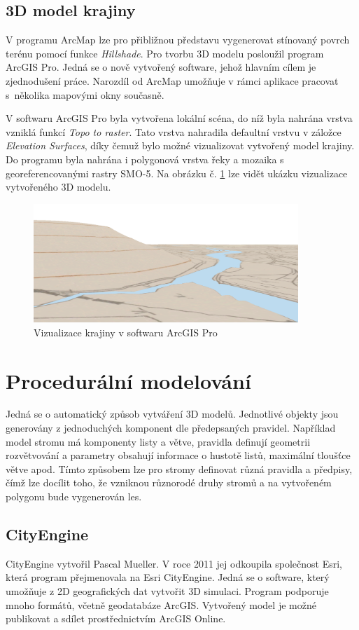 \documentclass[thesis=M,czech]{FITthesis}[2012/06/26]
\begin{document}
\subsection{3D model krajiny}
V programu ArcMap lze pro přibližnou představu vygenerovat stínovaný povrch terénu pomocí funkce \textit{Hillshade}. Pro tvorbu 3D modelu posloužil program ArcGIS Pro. Jedná se o nově vytvořený software, jehož hlavním cílem je zjednodušení práce. Narozdíl od ArcMap umožňuje v rámci aplikace pracovat s~několika mapovými okny současně. 

V softwaru ArcGIS Pro byla vytvořena lokální scéna, do níž byla nahrána vrstva vzniklá funkcí \textit{Topo to raster}. Tato vrstva nahradila defaultní vrstvu v záložce \textit{Elevation Surfaces}, díky čemuž bylo možné vizualizovat vytvořený model krajiny. Do programu byla nahrána i polygonová vrstva řeky a mozaika s georeferencovanými rastry SMO-5. Na obrázku č. \ref{obrazek:otava_knezihora} lze vidět ukázku vizualizace vytvořeného 3D modelu.

\begin{figure}[h]
	\centering
	\includegraphics[width=10cm]{pics/arcgispro.png}
	\caption{Vizualizace krajiny v softwaru ArcGIS Pro}
	\label{obrazek:otava_knezihora}
\end{figure}

\section{Procedurální modelování}
Jedná se o automatický způsob vytváření 3D modelů. Jednotlivé objekty jsou generovány z jednoduchých komponent dle předepsaných pravidel. Například model stromu má komponenty listy a větve, pravidla definují geometrii rozvětvování a parametry obsahují informace o hustotě listů, maximální tloušťce větve apod. Tímto způsobem lze pro stromy definovat různá pravidla a předpisy, čímž lze docílit toho, že vzniknou různorodé druhy stromů a na vytvořeném polygonu bude vygenerován les. \cite{jaderka}

\subsection{CityEngine}
CityEngine vytvořil Pascal Mueller. V roce 2011 jej odkoupila společnost Esri, která program přejmenovala na Esri CityEngine. Jedná se o software, který umožňuje z 2D geografických dat vytvořit 3D simulaci. Program podporuje mnoho formátů, včetně geodatabáze ArcGIS. Vytvořený model je možné publikovat a sdílet prostřednictvím ArcGIS Online. \cite{arcdata}
\end{document}
